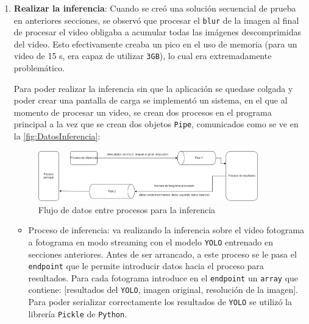 \begin{enumerate}
    \item \textbf{Realizar la inferencia}:\newline
    Cuando se creó una solución secuencial de prueba en anteriores secciones, se observó que procesar el \texttt{blur} de la imagen al final de procesar el video obligaba a acumular todas las imágenes 
    descomprimidas del video. Esto efectivamente creaba un pico en el uso de memoria  (para un video de 15 s, era capaz de utilizar \texttt{3GB}), lo cual era extremadamente problemático.

    Para poder realizar la inferencia sin que la aplicación se quedase colgada y poder crear una pantalla de carga se implementó un sistema, en el que al momento de procesar un video, se crean dos procesos 
    en el programa principal a la vez que se crean dos objetos \texttt{Pipe}, comunicados como se ve en la \autoref{fig:DatosInferencia}:
    \begin{figure}[H]
        \centering
        \includegraphics[width=0.9\textwidth]{images/6/6.5/Procesos1.png}
        \caption{Flujo de datos entre procesos para la inferencia}
        \label{fig:DatosInferencia}
    \end{figure}
    \vspace{2\baselineskip}
    \begin{itemize}
        \item Proceso de inferencia: va realizando la inferencia sobre el video fotograma a fotograma en modo streaming con el modelo \texttt{YOLO} entrenado en secciones anteriores. Antes de ser arrancado, 
        a este proceso se le pasa el \texttt{endpoint} que le permite introducir datos hacia el proceso para resultados. Para cada fotograma introduce en el \texttt{endpoint} un \texttt{array} que contiene: 
        [resultados del \texttt{YOLO}, imagen original, resolución de la imagen]. Para poder serializar correctamente los resultados de \texttt{YOLO} se utilizó la librería \texttt{Pickle} de \texttt{Python}.
        

\end{itemize}
\end{enumerate}
